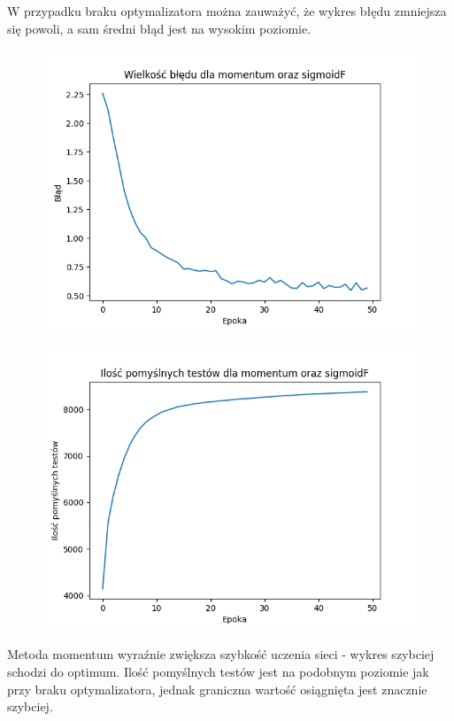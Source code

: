 \documentclass{article}
\begin{document}
W przypadku braku optymalizatora można zauważyć, że wykres błędu zmniejsza się powoli, a sam średni błąd jest
na wysokim poziomie.

\begin{figure}[!htb]
  \centering
  \includegraphics[width=\linewidth]{error_momentum_sigmoidF.png}
\end{figure}

\begin{figure}[!htb]
  \centering
  \includegraphics[width=\linewidth]{test_momentum_sigmoidF.png}
\end{figure}

Metoda momentum wyraźnie zwiększa szybkość uczenia sieci - wykres szybciej schodzi do optimum. Ilość pomyślnych testów
jest na podobnym poziomie jak przy braku optymalizatora, jednak graniczna wartość osiągnięta jest znacznie szybciej.
\end{document}
